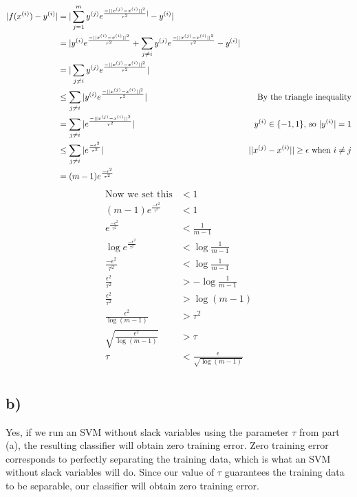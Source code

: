 \documentclass[11pt]{article}
\begin{document}
\begin{align*}
    |f(x^{(i)}) - y^{(i)}| &= |\sum_{j=1}^{m} y^{(j)} e^{\frac{-||x^{(j)} - x^{(i)}||^2}{\tau^2}|} - y^{(i)}| \\
                       &= |y^{(i)} e^{\frac{-||x^{(i)} - x^{(i)}||^2}{\tau^2}} + \sum_{j \ne i} y^{(j)} e^{\frac{-||x^{(j)} - x^{(i)}||^2}{\tau^2}} - y^{(i)}| \\
                       &= |\sum_{j \ne i} y^{(j)} e^{\frac{-||x^{(j)} - x^{(i)}||^2}{\tau^2}}| \\
                       &\le \sum_{j \ne i} | y^{(i)} e^{\frac{-||x^{(j)} - x^{(i)}||^2}{\tau^2}}| &\text{By the triangle inequality} \\
                       &= \sum_{j \ne i} | e^{\frac{-||x^{(j)} - x^{(i)}||^2}{\tau^2}}| &\text{$y^{(i)} \in \{-1,1\},$ so $|y^{(i)}| = 1$} \\
                       &\le \sum_{j \ne i} | e^{\frac{-\epsilon^2}{\tau^2}}| &\text{$||x^{(j)} - x^{(i)}|| \ge \epsilon$ when $i \ne j$} \\
                       &= (m-1) e^{\frac{-\epsilon^2}{\tau^2}} \\
\end{align*}
\begin{align*}
                  \text{Now we set this} &< 1 \\
    (m-1) e^{\frac{-\epsilon^2}{\tau^2}} &< 1 \\
          e^{\frac{-\epsilon^2}{\tau^2}} &< \frac{1}{m-1} \\
     \log e^{\frac{-\epsilon^2}{\tau^2}} &< \log \frac{1}{m-1} \\
            \frac{-\epsilon^2}{\tau^2}  &< \log  \frac{1}{m-1} \\
            \frac{\epsilon^2}{\tau^2}   &> - \log  \frac{1}{m-1} \\
            \frac{\epsilon^2}{\tau^2}   &> \log(m-1) \\
           \frac{\epsilon^2}{\log(m-1)} &> \tau^2 \\
    \sqrt{\frac{\epsilon^2}{\log(m-1)}} &> \tau \\
                                   \tau &< \frac{\epsilon}{\sqrt{\log(m-1)}} \\
\end{align*}

\subsection*{b)}
Yes, if we run an SVM without slack variables using the parameter $\tau$ from part (a), the resulting classifier will obtain zero training error. Zero training error corresponds to perfectly separating the training data, which is what an SVM without slack variables will do. Since our value of $\tau$ guarantees the training data to be separable, our classifier will obtain zero training error.
\end{document}
